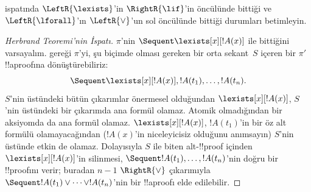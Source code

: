\begin{prob}
 ispatında $\LeftR{\lexists}$'in $\RightR{\lif}$'in
öncülünde bittiği ve $\LeftR{\lforall}$'ın $\LeftR{\lor}$'un sol öncülünde
bittiği durumları betimleyin.
\end{prob}

\begin{proof}[Herbrand Teoremi'nin İspatı]
$\pi$'nin $\Sequent \lexists[x][!A(x)]$ ile bittiğini varsayalım.
 gereği $\pi$'yi, şu biçimde olması gereken bir orta
sekant~$S$ içeren bir $\pi'$ !!a{proof}{}ına dönüştürebiliriz:
\[
\Sequent \lexists[x][!A(x)], !A(t_1), \dots, !A(t_n).
\]
$S$'nin üstündeki bütün çıkarımlar önermesel olduğundan
$\lexists[x][!A(x)]$, $S$'nin üstündeki bir çıkarımda ana formül olamaz. Atomik
olmadığından bir aksiyomda da ana formül olamaz. $\lexists[x][!A(x)]$,
$!A(t_1)$'in bir öz alt formülü olamayacağından ($!A(x)$'in niceleyicisiz
olduğunu anımsayın) $S$'nin üstünde etkin de olamaz. Dolayısıyla $S$ ile biten
alt-!!{proof} içinden $\lexists[x][!A(x)]$'in silinmesi, $\Sequent !A(t_1),
\dots, !A(t_n)$'nin doğru bir !!{proof}{}ını verir; buradan $n-1$
$\RightR{\lor}$ çıkarımıyla $\Sequent !A(t_1) \lor \dots \lor !A(t_n)$'nin
bir !!a{proof}{}ı elde edilebilir.
\end{proof}


